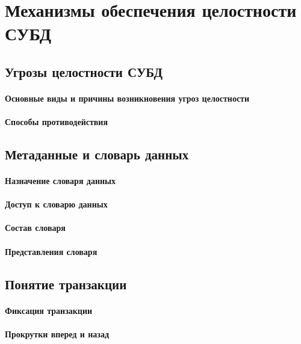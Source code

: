 \section{Механизмы обеспечения целостности СУБД}

\subsection{Угрозы целостности СУБД}

\paragraph{Основные виды и причины возникновения угроз целостности}
\paragraph{Способы противодействия}

\subsection{Метаданные и словарь данных}

\paragraph{Назначение словаря данных}
\paragraph{Доступ к словарю данных}
\paragraph{Состав словаря}
\paragraph{Представления словаря}

\subsection{Понятие транзакции}

\paragraph{Фиксация транзакции}
\paragraph{Прокрутки вперед и назад}
